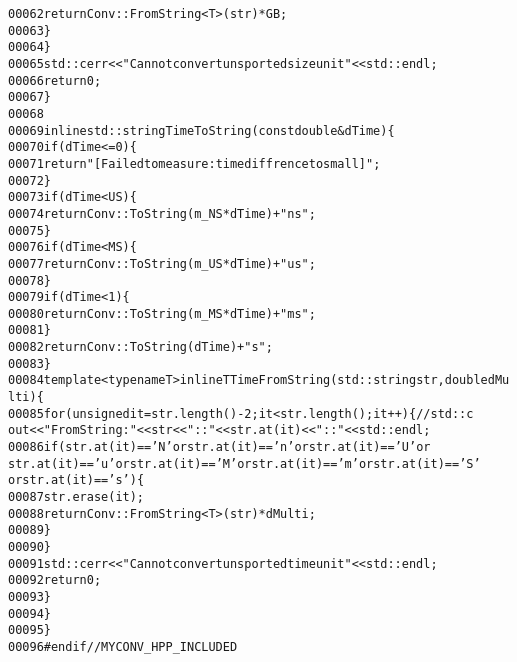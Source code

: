 \begin{footnotesize}
\begin{alltt}
00062                     \textcolor{keywordflow}{return} Conv::FromString<T>(str) * GB;
00063                 \}
00064             \}
00065             std::cerr<<\textcolor{stringliteral}{"Cannot convert unsported size unit"}<<std::endl;
00066             \textcolor{keywordflow}{return} 0;
00067         \}
00068 
00069         \textcolor{keyword}{inline} std::string TimeToString(\textcolor{keyword}{const} \textcolor{keywordtype}{double} &dTime)\{
00070             \textcolor{keywordflow}{if} ( dTime <= 0)\{
00071                 \textcolor{keywordflow}{return} \textcolor{stringliteral}{"[Failed to measure: time diffrence to small]"};
00072             \}
00073             \textcolor{keywordflow}{if} (dTime < US)\{
00074                 \textcolor{keywordflow}{return} Conv::ToString(m\_NS * dTime)+\textcolor{stringliteral}{"ns"};
00075             \}
00076             \textcolor{keywordflow}{if}(dTime < MS)\{
00077                 \textcolor{keywordflow}{return} Conv::ToString(m\_US * dTime)+\textcolor{stringliteral}{"us"};
00078             \}
00079             \textcolor{keywordflow}{if}(dTime < 1)\{
00080                 \textcolor{keywordflow}{return} Conv::ToString(m\_MS * dTime)+\textcolor{stringliteral}{"ms"};
00081             \}
00082             \textcolor{keywordflow}{return} Conv::ToString(dTime)+\textcolor{stringliteral}{"s"};
00083         \}
00084         \textcolor{keyword}{template} <\textcolor{keyword}{typename} T> \textcolor{keyword}{inline} T TimeFromString(std::string str, \textcolor{keywordtype}{double} dMu
      lti)\{
00085             \textcolor{keywordflow}{for} (\textcolor{keywordtype}{unsigned} it = str.length()-2; it < str.length(); it++)\{ \textcolor{comment}{//std::c
      out<<"FromString: "<<str<<"::"<<str.at(it)<<"::"<<std::endl;}
00086                 \textcolor{keywordflow}{if}(str.at(it) == \textcolor{charliteral}{'N'} or str.at(it) == \textcolor{charliteral}{'n'} or str.at(it) == \textcolor{charliteral}{'U'} or
       str.at(it) == \textcolor{charliteral}{'u'} or str.at(it) == \textcolor{charliteral}{'M'} or str.at(it) == \textcolor{charliteral}{'m'} or str.at(it) == \textcolor{charliteral}{'S'
      } or str.at(it) == \textcolor{charliteral}{'s'})\{
00087                     str.erase(it);
00088                     \textcolor{keywordflow}{return} Conv::FromString<T>(str) * dMulti;
00089                 \}
00090             \}
00091             std::cerr<<\textcolor{stringliteral}{"Cannot convert unsported time unit"}<<std::endl;
00092             \textcolor{keywordflow}{return} 0;
00093         \}
00094     \}
00095 \}
00096 \textcolor{preprocessor}{#endif // MYCONV\_HPP\_INCLUDED}
\end{alltt}\end{footnotesize}
